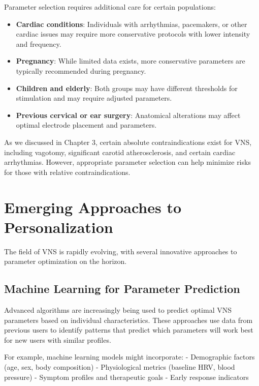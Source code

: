 \documentclass[
  Letterpaper,
]{scrbook}
\providecommand{\tightlist}{%
  \setlength{\itemsep}{0pt}\setlength{\parskip}{0pt}}\usepackage{longtable,booktabs,array}
\begin{document}
Parameter selection requires additional care for certain populations:

\begin{itemize}
\tightlist
\item
  \textbf{Cardiac conditions}: Individuals with arrhythmias, pacemakers,
  or other cardiac issues may require more conservative protocols with
  lower intensity and frequency.
\item
  \textbf{Pregnancy}: While limited data exists, more conservative
  parameters are typically recommended during pregnancy.
\item
  \textbf{Children and elderly}: Both groups may have different
  thresholds for stimulation and may require adjusted parameters.
\item
  \textbf{Previous cervical or ear surgery}: Anatomical alterations may
  affect optimal electrode placement and parameters.
\end{itemize}

As we discussed in Chapter 3, certain absolute contraindications exist
for VNS, including vagotomy, significant carotid atherosclerosis, and
certain cardiac arrhythmias. However, appropriate parameter selection
can help minimize risks for those with relative contraindications.

\section{Emerging Approaches to
Personalization}\label{emerging-approaches-to-personalization}

The field of VNS is rapidly evolving, with several innovative approaches
to parameter optimization on the horizon.

\subsection{Machine Learning for Parameter
Prediction}\label{machine-learning-for-parameter-prediction}

Advanced algorithms are increasingly being used to predict optimal VNS
parameters based on individual characteristics. These approaches use
data from previous users to identify patterns that predict which
parameters will work best for new users with similar profiles.

For example, machine learning models might incorporate: - Demographic
factors (age, sex, body composition) - Physiological metrics (baseline
HRV, blood pressure) - Symptom profiles and therapeutic goals - Early
response indicators
\end{document}
